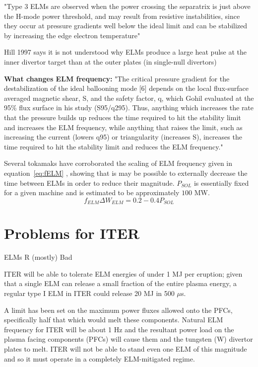 \documentclass[aps,prl,reprint]{revtex4-1}
\begin{document}
"Type 3 ELMs are observed when the power crossing the separatrix is just above the H-mode power threshold, and may result from resistive instabilities, since they occur at pressure gradients well below the ideal limit and can be stabilized by increasing the edge electron temperature"\citep{Hill1997}

Hill 1997\cite{Hill1997} says it is not understood why ELMs produce a large heat pulse at the inner divertor target than at the outer plates (in single-null divertors)

\textbf{What changes ELM frequency:}
"The critical pressure gradient for the destabilization of the ideal ballooning mode [6] depends on the local flux-surface averaged magnetic shear, S, and the safety factor, q, which Gohil evaluated at the 95\% flux surface in his study (S95/q295). Thus, anything which increases the rate that the pressure builds up reduces the time required to hit the stability limit and increases the ELM frequency, while anything that raises the limit, such as increasing the current (lowers q95) or triangularity (increases S), increases the time required to hit the stability limit and reduces the ELM frequency."\cite{Hill1997}

Several tokamaks have corroborated the scaling of ELM frequency given in equation~\ref{eq:fELM} \cite{Leonard1999}\cite{Loarte2002}, showing that is may be possible to externally decrease the time between ELMs in order to reduce their magnitude. $P_{SOL}$ is essentially fixed for a given machine and is estimated to be approximately $100$ MW.\cite{Eich2013}
\begin{equation}\label{eq:fELM}
f_{ELM}\Delta W_{ELM} = 0.2-0.4 P_{SOL}
\end{equation}

\section{Problems for ITER}\label{sec:Problems}
ELMs R (mostly) Bad \cite{Connor2008}

ITER will be able to tolerate ELM energies of under 1 MJ per eruption; given that a single ELM can release a small fraction of the entire plasma energy, a regular type I ELM in ITER could release 20 MJ in 500 $\mu$s\cite{KirkFF}. 

A limit has been set on the maximum power fluxes allowed onto the PFCs, specifically half that which would melt these components.\cite{Loarte2014a} Natural ELM frequency for ITER will be about 1 Hz and the resultant power load on the plasma facing components (PFCs) will cause them and the tungsten (W) divertor plates to melt\cite{Federici2003}. ITER will not be able to stand even one ELM of this magnitude and so it must operate in a completely ELM-mitigated regime.\cite{KirkFF}
\end{document}

